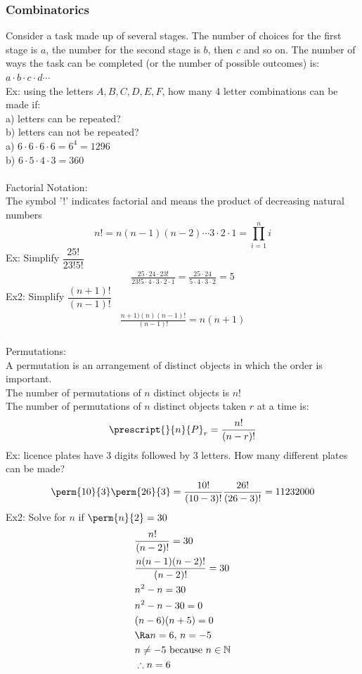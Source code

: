 \subsubsection{Combinatorics}
Consider a task made up of several stages. The number of choices for the first stage is $a$, the number for the second stage is $b$, then $c$ and so on. The number of ways the task can be completed (or the number of possible outcomes) is: $a\cdot b\cdot c\cdot d\cdots$\\
Ex: using the letters $A, B, C,D,E,F$, how many 4 letter combinations can be made if:\\
a) letters can be repeated?\\
b) letters can not be repeated?\\
a) $6\cdot6\cdot6\cdot6=6^4=1296$\\
b) $6\cdot5\cdot4\cdot3=360$\\
\\
Factorial Notation:\\
The symbol '!' indicates factorial and means the product of decreasing natural numbers
$$n!=n(n-1)(n-2)\cdots3\cdot2\cdot1=\prod_{i=1}^ni$$
Ex: Simplify $\dfrac{25!}{23!5!}$
\begin{align*}
    \frac{25\cdot24\cdot23!}{23!5\cdot4\cdot3\cdot2\cdot1}=\frac{25\cdot24}{5\cdot4\cdot3\cdot2}=5
\end{align*}
Ex2: Simplify $\dfrac{(n+1)!}{(n-1)!}$
\begin{align*}
    \frac{n+1)(n)(n-1)!}{(n-1)!}=n(n+1)
\end{align*}
\\
Permutations:\\
A permutation is an arrangement of distinct objects in which the order is important.\\
The number of permutations of $n$ distinct objects is $n!$\\
The number of permutations of $n$ distinct objects taken $r$ at a time is:
$$\prescript{}{n}{P}_r=\frac{n!}{(n-r)!}$$
Ex: licence plates have 3 digits followed by 3 letters. How many different plates can be made?\\
\begin{align*}
    \perm{10}{3}\perm{26}{3}=\frac{10!}{(10-3)!}\frac{26!}{(26-3)!}=11232000
\end{align*}
Ex2: Solve for $n$ if $\perm{n}{2}=30$
\begin{align*}
    &\frac{n!}{(n-2)!}=30\\
    &\frac{n(n-1)(n-2)!}{(n-2)!}=30\\
    &n^2-n=30\\
    &n^2-n-30=0\\
    &(n-6)(n+5)=0\\
    &\Ra n=6,\,n=-5\\
    &n\neq-5\text{ because }n\in\mathbb{N}\\
    &\therefore n=6
\end{align*}
